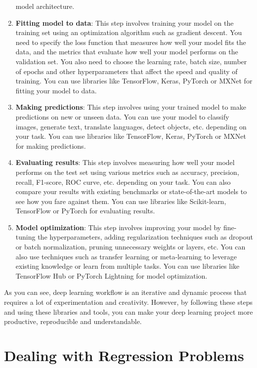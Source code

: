 \documentclass[
  letterpaper,
  DIV=11,
  numbers=noendperiod]{scrreprt}
\begin{document}
\begin{enumerate}
  model architecture.
\item
  \textbf{Fitting model to data}: This step involves training your model
  on the training set using an optimization algorithm such as gradient
  descent. You need to specify the loss function that measures how well
  your model fits the data, and the metrics that evaluate how well your
  model performs on the validation set. You also need to choose the
  learning rate, batch size, number of epochs and other hyperparameters
  that affect the speed and quality of training. You can use libraries
  like TensorFlow, Keras, PyTorch or MXNet for fitting your model to
  data.
\item
  \textbf{Making predictions}: This step involves using your trained
  model to make predictions on new or unseen data. You can use your
  model to classify images, generate text, translate languages, detect
  objects, etc. depending on your task. You can use libraries like
  TensorFlow, Keras, PyTorch or MXNet for making predictions.
\item
  \textbf{Evaluating results}: This step involves measuring how well
  your model performs on the test set using various metrics such as
  accuracy, precision, recall, F1-score, ROC curve, etc. depending on
  your task. You can also compare your results with existing benchmarks
  or state-of-the-art models to see how you fare against them. You can
  use libraries like Scikit-learn, TensorFlow or PyTorch for evaluating
  results.
\item
  \textbf{Model optimization}: This step involves improving your model
  by fine-tuning the hyperparameters, adding regularization techniques
  such as dropout or batch normalization, pruning unnecessary weights or
  layers, etc. You can also use techniques such as transfer learning or
  meta-learning to leverage existing knowledge or learn from multiple
  tasks. You can use libraries like TensorFlow Hub or PyTorch Lightning
  for model optimization.
\end{enumerate}

As you can see, deep learning workflow is an iterative and dynamic
process that requires a lot of experimentation and creativity. However,
by following these steps and using these libraries and tools, you can
make your deep learning project more productive, reproducible and
understandable.

\hypertarget{dealing-with-regression-problems}{%
\chapter{Dealing with Regression
Problems}\label{dealing-with-regression-problems}}
\end{document}

